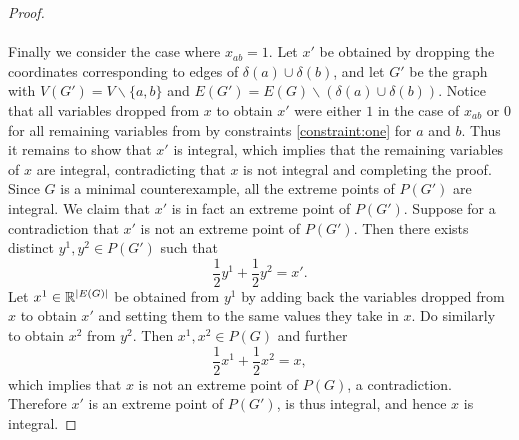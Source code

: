 \begin{proof}
\paragraph{}
Finally we consider the case where $x_{ab} = 1$. Let $x'$ be obtained by dropping the coordinates corresponding to edges of $\delta(a) \cup \delta(b)$, and let $G'$ be the graph with $V(G') = V \backslash \{a,b\}$ and $E(G') = E(G) \backslash (\delta(a) \cup \delta(b))$. Notice that all variables dropped from $x$ to obtain $x'$ were either $1$ in the case of $x_{ab}$ or $0$ for all remaining variables from by constraints \ref{constraint:one} for $a$ and $b$. Thus it remains to show that $x'$ is integral, which implies that the remaining variables of $x$ are integral, contradicting that $x$ is not integral and completing the proof. Since $G$ is a minimal counterexample, all the extreme points of $P(G')$ are integral. We claim that $x'$ is in fact an extreme point of $P(G')$. Suppose for a contradiction that $x'$ is not an extreme point of $P(G')$. Then there exists distinct $y^1, y^2 \in P(G')$ such that
$$\frac{1}{2}y^1 + \frac{1}{2} y^2 = x'.$$
Let $x^1 \in \mathbb{R}^{\left|E(G)\right|}$ be obtained from $y^1$ by adding back the variables dropped from $x$ to obtain $x'$ and setting them to the same values they take in $x$. Do similarly to obtain $x^2$ from $y^2$. Then $x^1, x^2 \in P(G)$ and further
$$\frac{1}{2} x^1 + \frac{1}{2} x^2 = x,$$
which implies that $x$ is not an extreme point of $P(G)$, a contradiction. Therefore $x'$ is an extreme point of $P(G')$, is thus integral, and hence $x$ is integral. 
\end{proof}